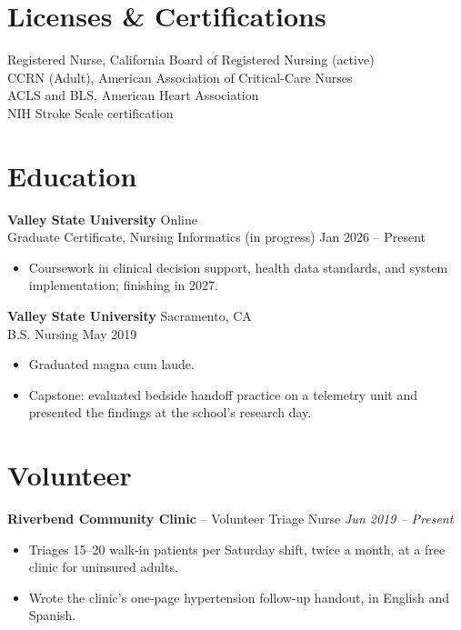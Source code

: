 \documentclass[11pt, letterpaper]{article}
\begin{document}
\section{Licenses \& Certifications}

Registered Nurse, California Board of Registered Nursing (active) \\
CCRN (Adult), American Association of Critical-Care Nurses \\
ACLS and BLS, American Heart Association \\
NIH Stroke Scale certification

\section{Education}

\textbf{Valley State University} \hfill Online \\
Graduate Certificate, Nursing Informatics (in progress) \hfill Jan 2026 – Present
\begin{itemize}
  \item Coursework in clinical decision support, health data standards, and system implementation; finishing in 2027.
\end{itemize}
\vspace{0pt}
\textbf{Valley State University} \hfill Sacramento, CA \\
B.S. Nursing \hfill May 2019
\begin{itemize}
  \item Graduated magna cum laude.
  \item Capstone: evaluated bedside handoff practice on a telemetry unit and presented the findings at the school's research day.
\end{itemize}
\vspace{0pt}
\section{Volunteer}

\textbf{Riverbend Community Clinic} -- {Volunteer Triage Nurse}
\hfill \textit{Jun 2019 – Present}
\begin{itemize}
  \item Triages 15–20 walk-in patients per Saturday shift, twice a month, at a free clinic for uninsured adults.
  \item Wrote the clinic's one-page hypertension follow-up handout, in English and Spanish.
\end{itemize}
\vspace{2pt}
\end{document}

